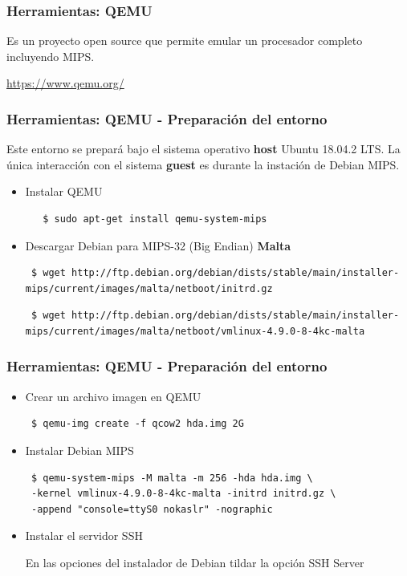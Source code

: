 \documentclass{beamer}
\begin{document}
  \begin{frame}
 \frametitle{Herramientas: QEMU}
Es un proyecto open source que permite emular un procesador completo incluyendo MIPS.

\url{https://www.qemu.org/}
  \end{frame}

  \begin{frame}[fragile]
 \frametitle{Herramientas: QEMU - Preparación del entorno}
Este entorno se prepará bajo el sistema operativo \textbf{host} Ubuntu 18.04.2 LTS. La única interacción con el sistema \textbf{guest} es durante la instación de Debian MIPS.

 \begin{itemize}
  \item Instalar QEMU
  \begin{verbatim}
   $ sudo apt-get install qemu-system-mips
  \end{verbatim}
\item Descargar Debian para MIPS-32 (Big Endian) \textbf{Malta}
\begin{lstlisting}
 $ wget http://ftp.debian.org/debian/dists/stable/main/installer-mips/current/images/malta/netboot/initrd.gz
\end{lstlisting}

\begin{lstlisting}
 $ wget http://ftp.debian.org/debian/dists/stable/main/installer-mips/current/images/malta/netboot/vmlinux-4.9.0-8-4kc-malta
\end{lstlisting}
\end{itemize}
  \end{frame}
  
 \begin{frame}[fragile]
 \frametitle{Herramientas: QEMU - Preparación del entorno}
 \begin{itemize}
  \item Crear un archivo imagen en QEMU
\begin{lstlisting}
 $ qemu-img create -f qcow2 hda.img 2G
\end{lstlisting}
\item Instalar Debian MIPS
\begin{lstlisting}
 $ qemu-system-mips -M malta -m 256 -hda hda.img \
 -kernel vmlinux-4.9.0-8-4kc-malta -initrd initrd.gz \
 -append "console=ttyS0 nokaslr" -nographic
\end{lstlisting}
\item Instalar el servidor SSH

En las opciones del instalador de Debian tildar la opción SSH Server
\end{itemize}
  \end{frame}
\end{document}
